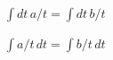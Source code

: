 \documentclass{article}
\begin{document}
$\int dt\,a/t=\int dt\,b/t$

$\int a/t\,dt=\int b/t\,dt$
\end{document}
